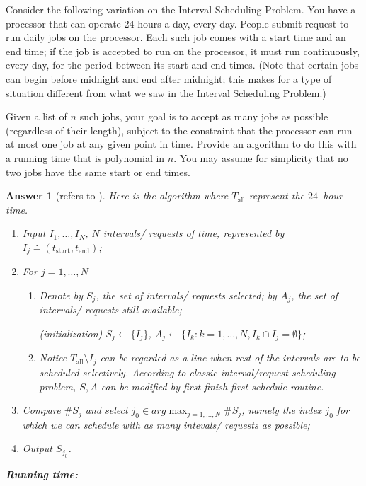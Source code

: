\documentclass[11pt]{article}
\theoremstyle{numberplain}
\theoremstyle{nonumberplain}
\newtheorem{ans}{Answer}
\newcommand{\dps}{\displaystyle}
\newcommand{\0}{{\mathbf{0}}}
\begin{document}
\begin{ques}[HW2,4-17]
Consider the following variation on the Interval Scheduling Problem. You have a processor that can operate 24 hours a day, every day. People submit request to run daily jobs on the processor. Each such job comes with a start time and an end time; if the job is accepted to run on the processor, it must run continuously, every day, for the period between its start and end times. (Note that certain jobs can begin before midnight and end after midnight; this makes for a type of situation  different from what we saw in the Interval Scheduling Problem.)\par
Given a list of $n$ such jobs, your goal is to accept as many jobs as possible (regardless of their length), subject to the constraint that the processor can run at most one job at any given point in time. Provide an algorithm to do this with a running time that is polynomial in $n$. You may assume for simplicity that no two jobs have the same start or end times. 
\end{ques}
\begin{ans}[refers to \cite{solcornell}]
Here is the algorithm where $T_{\text{all}}$ represent the $24$--hour time.
\begin{enumerate}
\item Input $I_1, \ldots, I_N$, $N$ intervals/ requests of time, represented by $I_j\doteq (t_{\text{start}}, t_{\text{end}})$;
\item For $j=1,\ldots, N$
\begin{enumerate}
\item Denote by $S_j$, the set of intervals/ requests selected; by $A_j$, the set of intervals/ requests still available;\par 
(initialization) $S_j\leftarrow \{I_j\}$, $A_j\leftarrow \{I_k:k=1,\ldots, N, I_k\cap I_j=\emptyset \}$;
\item Notice $T_{\text{all}}\setminus I_j$ can be regarded as a line when rest of the intervals are to be scheduled selectively. According to classic interval/request scheduling problem, $S, A$ can be modified by first-finish-first schedule routine.
\end{enumerate}
\item Compare $\# S_j$ and select $\dps j_0\in arg\max_{j=1,\ldots,N} \# S_j$, namely the index $j_0$ for which we can schedule with as many intevals/ requests as possible;
\item Output $S_{j_0}$.
\end{enumerate}
\textbf{Running time:}
\end{ans}
\end{document}
